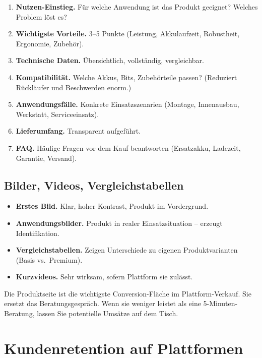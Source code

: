 \documentclass[11pt,a4paper,oneside]{article}
\begin{document}
\begin{enumerate}
  \item \textbf{Nutzen-Einstieg.} Für welche Anwendung ist das Produkt geeignet? Welches Problem löst es?
  \item \textbf{Wichtigste Vorteile.} 3--5 Punkte (Leistung, Akkulaufzeit, Robustheit, Ergonomie, Zubehör).
  \item \textbf{Technische Daten.} Übersichtlich, vollständig, vergleichbar.
  \item \textbf{Kompatibilität.} Welche Akkus, Bits, Zubehörteile passen? (Reduziert Rückläufer und Beschwerden enorm.)
  \item \textbf{Anwendungsfälle.} Konkrete Einsatzszenarien (Montage, Innenausbau, Werkstatt, Serviceeinsatz).
  \item \textbf{Lieferumfang.} Transparent aufgeführt.
  \item \textbf{FAQ.} Häufige Fragen vor dem Kauf beantworten (Ersatzakku, Ladezeit, Garantie, Versand).
\end{enumerate}

\subsection{Bilder, Videos, Vergleichstabellen}

\begin{itemize}
  \item \textbf{Erstes Bild.} Klar, hoher Kontrast, Produkt im Vordergrund.
  \item \textbf{Anwendungsbilder.} Produkt in realer Einsatzsituation -- erzeugt Identifikation.
  \item \textbf{Vergleichstabellen.} Zeigen Unterschiede zu eigenen Produktvarianten (Basis vs.\ Premium).
  \item \textbf{Kurzvideos.} Sehr wirksam, sofern Plattform sie zulässt.
\end{itemize}

\begin{merkbox}
Die Produktseite ist die wichtigste Conversion-Fläche im Plattform-Verkauf. Sie ersetzt das Beratungsgespräch. Wenn sie weniger leistet als eine 5-Minuten-Beratung, lassen Sie potentielle Umsätze auf dem Tisch.
\end{merkbox}

\section{Kundenretention auf Plattformen}
\end{document}
